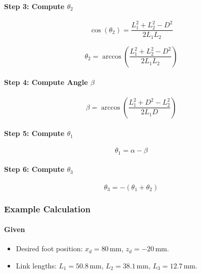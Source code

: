 \documentclass{article}
\begin{document}
\paragraph{Step 3: Compute $\theta_2$}

\begin{equation}
\cos(\theta_2) = \frac{L_1^2 + L_2^2 - D^2}{2 L_1 L_2}
\end{equation}

\begin{equation}
\theta_2 = \arccos\left( \frac{L_1^2 + L_2^2 - D^2}{2 L_1 L_2} \right)
\end{equation}

\paragraph{Step 4: Compute Angle $\beta$}

\begin{equation}
\beta = \arccos\left( \frac{L_1^2 + D^2 - L_2^2}{2 L_1 D} \right)
\end{equation}

\paragraph{Step 5: Compute $\theta_1$}

\begin{equation}
\theta_1 = \alpha - \beta
\end{equation}

\paragraph{Step 6: Compute $\theta_3$}

\begin{equation}
\theta_3 = -(\theta_1 + \theta_2)
\end{equation}

\subsubsection{Example Calculation}

\paragraph{Given}

\begin{itemize}
    \item Desired foot position: $x_d = 80\,\text{mm}$, $z_d = -20\,\text{mm}$.
    \item Link lengths: $L_1 = 50.8\,\text{mm}$, $L_2 = 38.1\,\text{mm}$, $L_3 = 12.7\,\text{mm}$.
\end{itemize}
\end{document}
